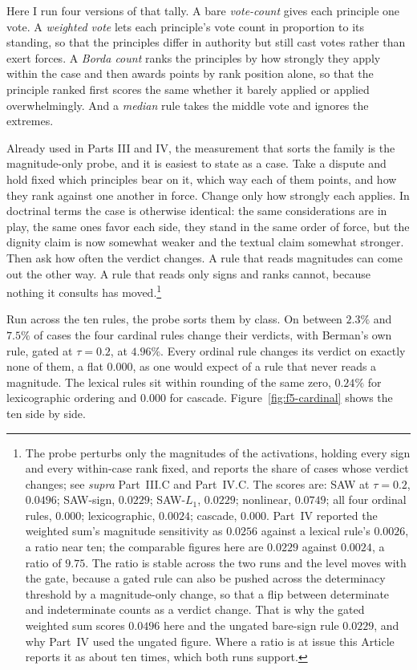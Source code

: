 Here I run four versions of that tally. A bare
\textit{vote-count} gives each principle one vote. A \textit{weighted
vote} lets each principle's vote count in proportion to its standing, so
that the principles differ in authority but still cast votes rather than
exert forces. A \textit{Borda count} ranks the principles by how strongly
they apply within the case and then awards points by rank position alone,
so that the principle ranked first scores the same whether it barely
applied or applied overwhelmingly. And a \textit{median} rule takes the
middle vote and ignores the extremes.

Already used in Parts III and IV, the measurement that sorts the family is
the magnitude-only probe, and it is easiest to state as a case. Take a
dispute and hold fixed which principles bear on it, which way each of
them points, and how they rank against one another in force. Change only
how strongly each applies. In doctrinal terms the case is otherwise
identical: the same considerations are in play, the same ones favor each
side, they stand in the same order of force, but the dignity claim is now
somewhat weaker and the textual claim somewhat stronger. Then ask how
often the verdict changes. A rule that reads magnitudes can come out the
other way. A rule that reads only signs and ranks cannot, because nothing
it consults has moved.\footnote{The probe perturbs only the magnitudes of
the activations, holding every sign and every within-case rank fixed, and
reports the share of cases whose verdict changes; see \textit{supra}
Part~III.C and Part~IV.C. The scores are: SAW at $\tau = 0.2$, $0.0496$;
SAW-sign, $0.0229$; SAW-$L_1$, $0.0229$; nonlinear, $0.0749$; all four
ordinal rules, $0.000$; lexicographic, $0.0024$; cascade, $0.000$.
Part~IV reported the weighted sum's magnitude sensitivity as $0.0256$
against a lexical rule's $0.0026$, a ratio near ten; the comparable
figures here are $0.0229$ against $0.0024$, a ratio of $9.75$. The ratio
is stable across the two runs and the level moves with the gate, because
a gated rule can also be pushed across the determinacy threshold by a
magnitude-only change, so that a flip between determinate and
indeterminate counts as a verdict change. That is why the gated weighted
sum scores $0.0496$ here and the ungated bare-sign rule $0.0229$, and why
Part~IV used the ungated figure. Where a ratio is at issue this Article
reports it as about ten times, which both runs support.}

Run across the ten rules, the probe sorts them by class. On between $2.3\%$ and $7.5\%$ of cases the four cardinal rules change
their verdicts, with Berman's own rule, gated at $\tau = 0.2$, at $4.96\%$. Every ordinal rule changes its verdict on exactly none of them, a flat
$0.000$, as one would expect of a rule that never reads a magnitude.
The lexical rules sit within rounding of the same zero, $0.24\%$ for
lexicographic ordering and $0.000$ for cascade.
Figure~\ref{fig:f5-cardinal} shows the ten side by side.

